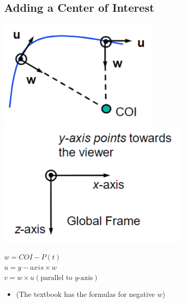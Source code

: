 \documentclass{article}
\begin{document}
\subsection*{Adding a Center of Interest}
\begin{center}
    \includegraphics*[scale=0.5]{W4_14.png}
    \hspace{1cm}
    \includegraphics*[scale=0.5]{W4_15.png}
\end{center}
$w = COI - P(t)$\\
$u = y-axis \times w$\\
$v = w \times u (\text{parallel to $y$-axis})$
\begin{itemize}
    \item (The textbook has the formulas for negative $w$)
\end{itemize}
\end{document}
